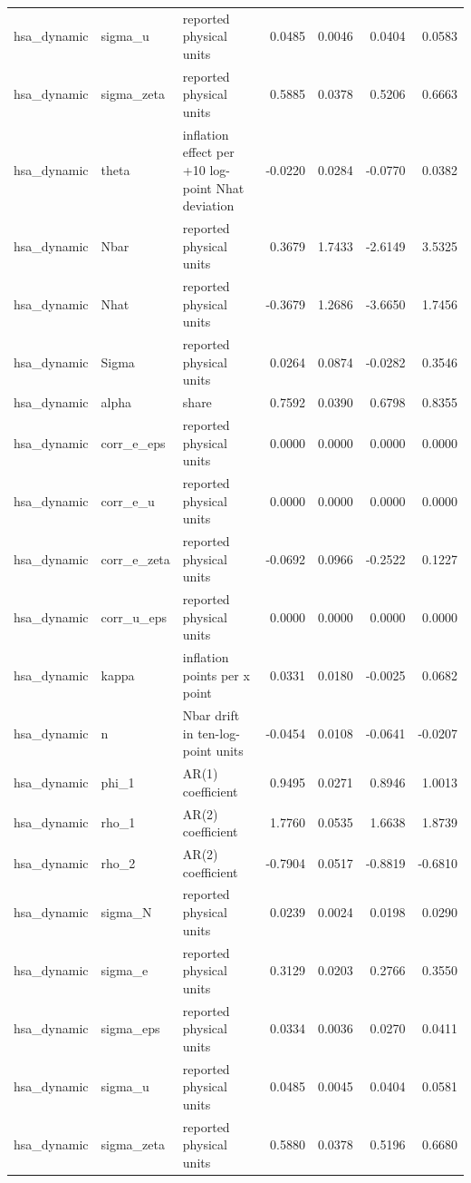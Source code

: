 \begin{tabular}{lllrrrr}
hsa\_dynamic & sigma\_u & reported physical units & 0.0485 & 0.0046 & 0.0404 & 0.0583 \\
hsa\_dynamic & sigma\_zeta & reported physical units & 0.5885 & 0.0378 & 0.5206 & 0.6663 \\
hsa\_dynamic & theta & inflation effect per +10 log-point Nhat deviation & -0.0220 & 0.0284 & -0.0770 & 0.0382 \\
hsa\_dynamic & Nbar & reported physical units & 0.3679 & 1.7433 & -2.6149 & 3.5325 \\
hsa\_dynamic & Nhat & reported physical units & -0.3679 & 1.2686 & -3.6650 & 1.7456 \\
hsa\_dynamic & Sigma & reported physical units & 0.0264 & 0.0874 & -0.0282 & 0.3546 \\
hsa\_dynamic & alpha & share & 0.7592 & 0.0390 & 0.6798 & 0.8355 \\
hsa\_dynamic & corr\_e\_eps & reported physical units & 0.0000 & 0.0000 & 0.0000 & 0.0000 \\
hsa\_dynamic & corr\_e\_u & reported physical units & 0.0000 & 0.0000 & 0.0000 & 0.0000 \\
hsa\_dynamic & corr\_e\_zeta & reported physical units & -0.0692 & 0.0966 & -0.2522 & 0.1227 \\
hsa\_dynamic & corr\_u\_eps & reported physical units & 0.0000 & 0.0000 & 0.0000 & 0.0000 \\
hsa\_dynamic & kappa & inflation points per x point & 0.0331 & 0.0180 & -0.0025 & 0.0682 \\
hsa\_dynamic & n & Nbar drift in ten-log-point units & -0.0454 & 0.0108 & -0.0641 & -0.0207 \\
hsa\_dynamic & phi\_1 & AR(1) coefficient & 0.9495 & 0.0271 & 0.8946 & 1.0013 \\
hsa\_dynamic & rho\_1 & AR(2) coefficient & 1.7760 & 0.0535 & 1.6638 & 1.8739 \\
hsa\_dynamic & rho\_2 & AR(2) coefficient & -0.7904 & 0.0517 & -0.8819 & -0.6810 \\
hsa\_dynamic & sigma\_N & reported physical units & 0.0239 & 0.0024 & 0.0198 & 0.0290 \\
hsa\_dynamic & sigma\_e & reported physical units & 0.3129 & 0.0203 & 0.2766 & 0.3550 \\
hsa\_dynamic & sigma\_eps & reported physical units & 0.0334 & 0.0036 & 0.0270 & 0.0411 \\
hsa\_dynamic & sigma\_u & reported physical units & 0.0485 & 0.0045 & 0.0404 & 0.0581 \\
hsa\_dynamic & sigma\_zeta & reported physical units & 0.5880 & 0.0378 & 0.5196 & 0.6680 \\

\end{tabular}

